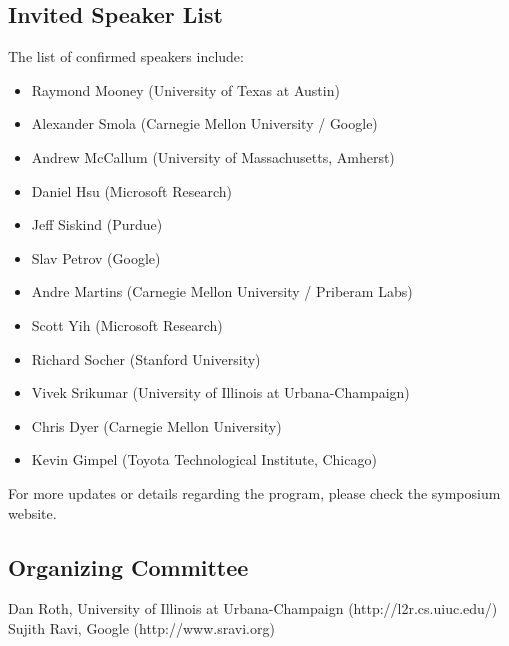 \subsection*{Invited Speaker List}

The list of confirmed speakers include:
%
\begin{itemize}
\item Raymond Mooney (University of Texas at Austin)
\item Alexander Smola (Carnegie Mellon University / Google)
\item Andrew McCallum (University of Massachusetts, Amherst)
\item Daniel Hsu (Microsoft Research)
\item Jeff Siskind (Purdue)
\item Slav Petrov (Google)
\item Andre Martins (Carnegie Mellon University / Priberam Labs)
\item Scott Yih (Microsoft Research)
\item Richard Socher (Stanford University)
\item Vivek Srikumar (University of Illinois at Urbana-Champaign)
\item Chris Dyer (Carnegie Mellon University)
\item Kevin Gimpel (Toyota Technological Institute, Chicago)
\end{itemize}

For more updates or details regarding the program, please check the symposium website.

\subsection*{Organizing Committee}
%
\noindent Dan Roth, University of Illinois at Urbana-Champaign (http://l2r.cs.uiuc.edu/) \\
\noindent Sujith Ravi, Google (http://www.sravi.org)

